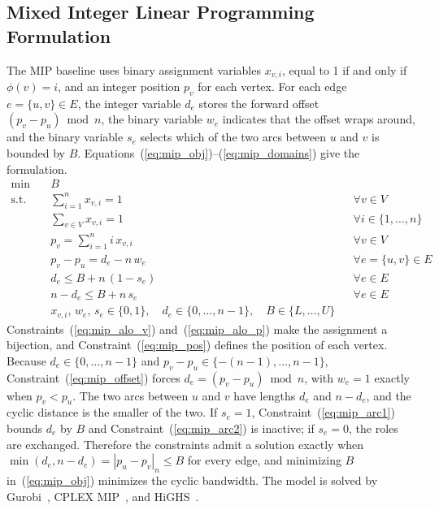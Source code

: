 \documentclass[a4paper,fleqn]{cas-sc}
\begin{document}
\subsection{Mixed Integer Linear Programming Formulation}

The MIP baseline uses binary assignment variables $x_{v,i}$, equal to 1 if and only if $\phi(v)=i$, and an integer position $p_v$ for each vertex. For each edge $e=\{u,v\}\in E$, the integer variable $d_e$ stores the forward offset $(p_v-p_u)\bmod n$, the binary variable $w_e$ indicates that the offset wraps around, and the binary variable $s_e$ selects which of the two arcs between $u$ and $v$ is bounded by $B$. Equations~(\ref{eq:mip_obj})--(\ref{eq:mip_domains}) give the formulation.
\begin{align}
    \min\quad & B \label{eq:mip_obj}\\
    \text{s.t.}\quad & \sum_{i=1}^{n}x_{v,i}=1 && \forall v\in V \label{eq:mip_alo_v}\\
    & \sum_{v\in V}x_{v,i}=1 && \forall i\in\{1,\dots,n\} \label{eq:mip_alo_p}\\
    & p_v=\sum_{i=1}^{n}i\,x_{v,i} && \forall v\in V \label{eq:mip_pos}\\
    & p_v-p_u=d_e-n\,w_e && \forall e=\{u,v\}\in E \label{eq:mip_offset}\\
    & d_e\le B+n\,(1-s_e) && \forall e\in E \label{eq:mip_arc1}\\
    & n-d_e\le B+n\,s_e && \forall e\in E \label{eq:mip_arc2}\\
    & x_{v,i},\,w_e,\,s_e\in\{0,1\},\quad d_e\in\{0,\dots,n-1\},\quad B\in\{L,\dots,U\} \label{eq:mip_domains}
\end{align}
Constraints~(\ref{eq:mip_alo_v}) and~(\ref{eq:mip_alo_p}) make the assignment a bijection, and Constraint~(\ref{eq:mip_pos}) defines the position of each vertex. Because $d_e\in\{0,\dots,n-1\}$ and $p_v-p_u\in\{-(n-1),\dots,n-1\}$, Constraint~(\ref{eq:mip_offset}) forces $d_e=(p_v-p_u)\bmod n$, with $w_e=1$ exactly when $p_v<p_u$. The two arcs between $u$ and $v$ have lengths $d_e$ and $n-d_e$, and the cyclic distance is the smaller of the two. If $s_e=1$, Constraint~(\ref{eq:mip_arc1}) bounds $d_e$ by $B$ and Constraint~(\ref{eq:mip_arc2}) is inactive; if $s_e=0$, the roles are exchanged. Therefore the constraints admit a solution exactly when $\min(d_e,n-d_e)=|p_u-p_v|_n\le B$ for every edge, and minimizing $B$ in~(\ref{eq:mip_obj}) minimizes the cyclic bandwidth. The model is solved by Gurobi~\citep{gurobi}, CPLEX MIP~\citep{cplex}, and HiGHS~\citep{huangfu2018}.
\end{document}

